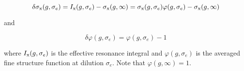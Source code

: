$$\delta\sigma_{\rm x}(g,\sigma_e)=I_{\rm x}(g,\sigma_e)-\sigma_{\rm x}(g,\infty)=\sigma_{\rm x}(g,\sigma_e)\varphi(g,\sigma_e)-\sigma_{\rm x}(g,\infty)$$

\noindent and

$$\delta\varphi(g,\sigma_e)=\varphi(g,\sigma_e)-1$$

\noindent where $I_{\rm x}(g,\sigma_e)$ is the effective resonance integral and $\varphi(g,\sigma_e)$ is the averaged fine
structure function at dilution $\sigma_e$. Note that $\varphi(g,\infty)=1$.

\eject
